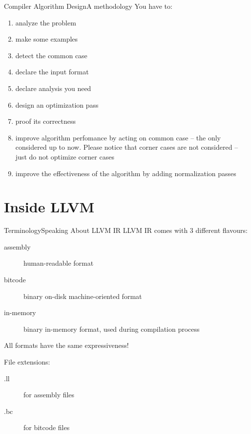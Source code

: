 \documentclass[10pt,mathserif]{beamer}
\begin{document}
\begin{frame}{Compiler Algorithm Design}{A methodology}
You have to:

\begin{enumerate}
\item analyze the problem
\item make some examples
\item detect the common case
\item declare the \alert{input format}
\item declare \alert{analysis} you need
\item design an \alert{optimization} pass
\item proof its \alert{correctness}
\item improve algorithm perfomance by acting on common case -- the only
      considered up to now. Please notice that corner cases are not considered
      -- just do not optimize corner cases
\item improve the effectiveness of the algorithm by adding
      \alert{normalization passes}
\end{enumerate}
\end{frame}

\section{Inside LLVM}
\begin{frame}{Terminology}{Speaking About LLVM IR}
LLVM IR comes with 3 different flavours:

\begin{description}
\item[assembly] human-readable format
\item[bitcode] binary on-disk machine-oriented format
\item[in-memory] binary in-memory format, used during compilation process
\end{description}

All formats have the same expressiveness!

\vfill
File extensions:

\begin{description}
\item[.ll] for assembly files
\item[.bc] for bitcode files
\end{description}
\end{frame}
\end{document}
